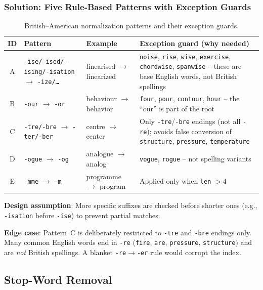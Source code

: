 \documentclass[12pt,a4paper]{article}
\begin{document}
\subsubsection{Solution: Five Rule-Based Patterns with Exception Guards}

\begin{table}[H]
\centering\small
\caption{British--American normalization patterns and their exception guards.}
\label{tab:patterns}
\begin{tabular}{@{}c l l p{4.8cm}@{}}
\toprule
\textbf{ID} & \textbf{Pattern} & \textbf{Example} & \textbf{Exception guard (why needed)} \\
\midrule
A & \texttt{-ise/-ised/-ising/-isation} $\to$ \texttt{-ize/\ldots} & linearised $\to$ linearized & \texttt{noise}, \texttt{rise}, \texttt{wise}, \texttt{exercise}, \texttt{chordwise}, \texttt{spanwise} -- these are base English words, not British spellings \\
B & \texttt{-our} $\to$ \texttt{-or} & behaviour $\to$ behavior & \texttt{four}, \texttt{pour}, \texttt{contour}, \texttt{hour} -- the ``our'' is part of the root \\
C & \texttt{-tre/-bre} $\to$ \texttt{-ter/-ber} & centre $\to$ center & Only \texttt{-tre}/\texttt{-bre} endings (not all \texttt{-re}); avoids false conversion of \texttt{structure}, \texttt{pressure}, \texttt{temperature} \\
D & \texttt{-ogue} $\to$ \texttt{-og} & analogue $\to$ analog & \texttt{vogue}, \texttt{rogue} -- not spelling variants \\
E & \texttt{-mme} $\to$ \texttt{-m} & programme $\to$ program & Applied only when \texttt{len} $> 4$ \\
\bottomrule
\end{tabular}
\end{table}

\textbf{Design assumption}: More specific suffixes are checked before shorter
ones (e.g., \texttt{-isation} before \texttt{-ise}) to prevent partial matches.

\textbf{Edge case}: Pattern~C is deliberately restricted to \texttt{-tre} and
\texttt{-bre} endings only.  Many common English words end in \texttt{-re}
(\texttt{fire}, \texttt{are}, \texttt{pressure}, \texttt{structure}) and are
\textit{not} British spellings.  A blanket \texttt{-re}$\to$\texttt{-er} rule
would corrupt the index.

\subsection{Stop-Word Removal}
\label{sec:stopwords}
\end{document}
